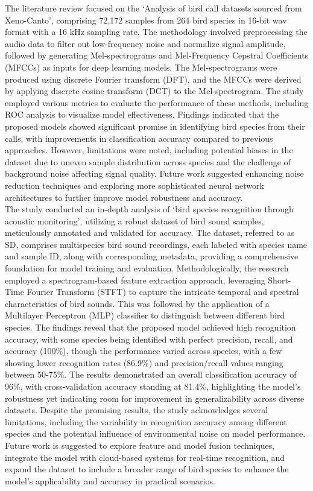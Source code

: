 The literature review focused on the `Analysis of bird call datasets sourced
from Xeno-Canto', comprising 72,172 samples from 264 bird species in 16-bit wav
format with a 16 kHz sampling rate. The methodology involved preprocessing the
audio data to filter out low-frequency noise and normalize signal amplitude,
followed by generating Mel-spectrograms and Mel-Frequency Cepstral Coefficients
(MFCCs) as inputs for deep learning models. The Mel-spectrograms were produced
using discrete Fourier transform (DFT), and the MFCCs were derived by applying
discrete cosine transform (DCT) to the Mel-spectrogram. The study employed
various metrics to evaluate the performance of these methods, including ROC
analysis to visualize model effectiveness. Findings indicated that the proposed
models showed significant promise in identifying bird species from their calls,
with improvements in classification accuracy compared to previous approaches.
However, limitations were noted, including potential biases in the dataset due
to uneven sample distribution across species and the challenge of background
noise affecting signal quality. Future work suggested enhancing noise reduction
techniques and exploring more sophisticated neural network architectures to
further improve model robustness and accuracy.\cite{wang2022efficient}\\

The study conducted an in-depth analysis of `bird species recognition through
acoustic monitoring', utilizing a robust dataset of bird sound samples,
meticulously annotated and validated for accuracy. The dataset, referred to as
SD, comprises multispecies bird sound recordings, each labeled with species
name and sample ID, along with corresponding metadata, providing a
comprehensive foundation for model training and evaluation. Methodologically,
the research employed a spectrogram-based feature extraction approach,
leveraging Short-Time Fourier Transform (STFT) to capture the intricate
temporal and spectral characteristics of bird sounds. This was followed by the
application of a Multilayer Perceptron (MLP) classifier to distinguish between
different bird species. The findings reveal that the proposed model achieved
high recognition accuracy, with some species being identified with perfect
precision, recall, and accuracy (100\%), though the performance varied across
species, with a few showing lower recognition rates (86.9\%) and
precision/recall values ranging between 50-75\%. The results demonstrated an
overall classification accuracy of 96\%, with cross-validation accuracy
standing at 81.4\%, highlighting the model's robustness yet indicating room for
improvement in generalizability across diverse datasets. Despite the promising
results, the study acknowledges several limitations, including the variability
in recognition accuracy among different species and the potential influence of
environmental noise on model performance. Future work is suggested to explore
feature and model fusion techniques, integrate the model with cloud-based
systems for real-time recognition, and expand the dataset to include a broader
range of bird species to enhance the model's applicability and accuracy in
practical scenarios.\cite{pahuja2021sound}\\ \\
